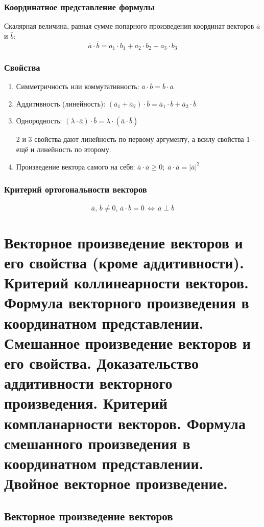 \documentclass{article}
\begin{document}
\subsubsection{Координатное представление формулы}
Скалярная величина, равная сумме попарного произведения координат векторов $\overline{a}$ и $\overline{b}$: $$\overline{a}\cdot\overline{b}=a_1\cdot b_1+a_2\cdot b_2+a_3\cdot b_3$$
\subsubsection{Свойства}
\begin{enumerate}
    \item Симметричность или коммутативность: $\overline{a}\cdot\overline{b}=\overline{b}\cdot\overline{a}$
    \item Аддитивность (линейность): $(\overline{a}_1+\overline{a}_2)\cdot\overline{b}=\overline{a}_1\cdot\overline{b}+\overline{a}_2\cdot\overline{b}$
    \item Однородность: $(\lambda\cdot\overline{a})\cdot\overline{b}=\lambda\cdot(\overline{a}\cdot\overline{b})$
    
    2 и 3 свойства дают линейность по первому аргументу, а всилу свойства 1 -- ещё и линейность по второму.
    \item Произведение вектора самого на себя: $\overline{a}\cdot\overline{a}\geqslant 0;\;\overline{a}\cdot\overline{a}=|\overline{a}|^2$
\end{enumerate}
\subsubsection{Критерий ортогональности векторов}
$$ \overline{a},\,\overline{b}\neq 0,\,\overline{a}\cdot\overline{b}=0\,\Leftrightarrow\,\overline{a}\perp\overline{b} $$

\newpage
\section{Векторное произведение векторов и его свойства (кроме аддитивности). Критерий коллинеарности векторов. Формула векторного произведения в координатном представлении. Смешанное произведение векторов и его свойства. Доказательство аддитивности векторного произведения. Критерий компланарности векторов. Формула смешанного произведения в координатном представлении. Двойное векторное произведение.}
\subsection{Векторное произведение векторов}
\end{document}
